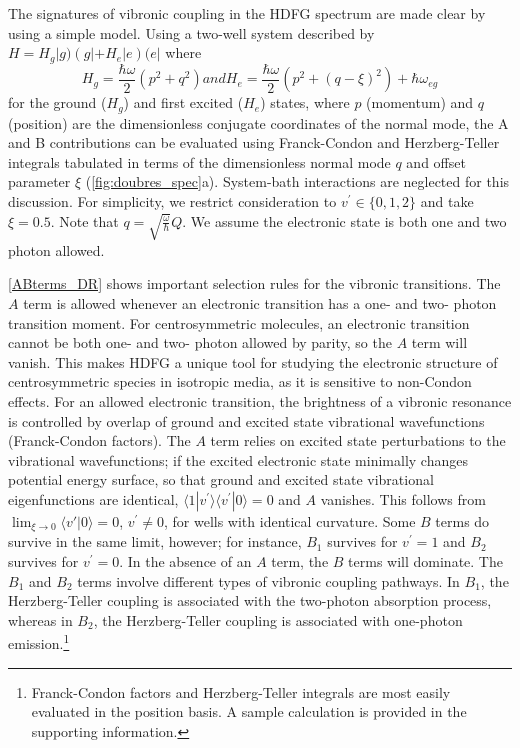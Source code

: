 \documentclass[aip, jcp, reprint, onecolumn, nofootinbib]{revtex4-2}
\begin{document}
The signatures of vibronic coupling in the HDFG spectrum are made clear by using a simple model.
Using a two-well system described by $H = H_g |g) \left(g| + H_e |e\right) (e|$ where
\begin{subequations}\label{Hamiltonian}
	\begin{equation}
		H_g = \frac{\hbar \omega }{2} \left(p^2 + q^2 \right)
	\end{equation}
	and
	\begin{equation}
		H_e = \frac{\hbar \omega }{2} \left(p^2 +  (q-\xi)^2 \right) + \hbar \omega_{eg}
	\end{equation}
\end{subequations}
for the ground ($H_g$) and first excited ($H_e$) states, where $p$ (momentum) and $q$ (position) are the dimensionless conjugate coordinates of the normal mode, the A and B contributions can be evaluated using Franck-Condon and Herzberg-Teller integrals tabulated in terms of the dimensionless normal mode $q$ and offset parameter $\xi$ (\autoref{fig:doubres_spec}a).\cite{Carlson1988thesis}
System-bath interactions are neglected for this discussion.
For simplicity, we restrict consideration to $v^\prime \in \{0,1,2\}$ and take $\xi = 0.5$.
Note that $q = \sqrt{\frac{\omega}{\hbar}} Q$.
We assume the electronic state is both one and two photon allowed.

\autoref{ABterms_DR} shows important selection rules for the vibronic transitions.
The $A$ term is allowed whenever an electronic transition has a one- and two- photon transition moment.
For centrosymmetric molecules, an electronic transition cannot be both one- and two- photon allowed by parity, so the $A$ term will vanish.
This makes HDFG a unique tool for studying the electronic structure of centrosymmetric species in isotropic media, as it is sensitive to non-Condon effects.\cite{Olson2018}
For an allowed electronic transition, the brightness of a vibronic resonance is controlled by overlap of ground and excited state vibrational wavefunctions (Franck-Condon factors).
The $A$ term relies on excited state perturbations to the vibrational wavefunctions; if the excited electronic state minimally changes potential energy surface, so that ground and excited state vibrational eigenfunctions are identical, $\langle 1 | v^\prime \rangle \langle v^\prime | 0 \rangle = 0$ and $A$ vanishes.
This follows from $\lim_{\xi \rightarrow 0} \langle v' | 0 \rangle = 0$, $v^\prime \neq 0$, for wells with identical curvature.
Some $B$ terms do survive in the same limit, however; for instance, $B_1$ survives for $v^\prime=1$ and $B_2$ survives for $v^\prime=0$.
In the absence of an $A$ term, the $B$ terms will dominate.
The $B_1$ and $B_2$ terms involve different types of vibronic coupling pathways.
In $B_1$, the Herzberg-Teller coupling is associated with the two-photon absorption process, whereas in $B_2$, the Herzberg-Teller coupling is associated with one-photon emission.\footnote{Franck-Condon factors and Herzberg-Teller integrals are most easily evaluated in the position basis. A sample calculation is provided in the supporting information.}
\end{document}
